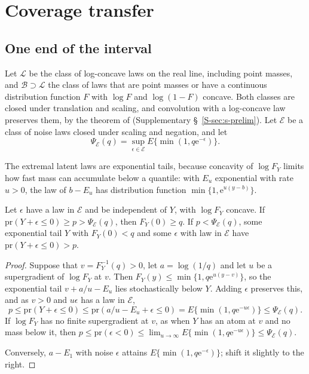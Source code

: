 \documentclass[lineno]{biometrika}
\newcommand{\pr}{\mathrm{pr}}
\newcommand{\LC}{\mathcal{L}}
\begin{document}
\section{Coverage transfer}\label{sec:general}

\subsection{One end of the interval}

Let $\LC$ be the class of log-concave laws on the real line, including point masses, and $\mathcal B \supset \LC$ the class of laws that are point masses or have a continuous distribution function $F$ with $\log F$ and $\log(1 - F)$ concave. Both classes are closed under translation and scaling, and convolution with a log-concave law preserves them, by the theorem of \citet{prekopa1973} (Supplementary \S~\ref{S-sec:s-prelim}). Let $\mathcal E$ be a class of noise laws closed under scaling and negation, and let
\[
\Psi_{\mathcal E}(q) = \sup_{\epsilon \in \mathcal E} E\{\min(1, q \mathrm{e}^{-\epsilon})\}.
\]

The extremal latent laws are exponential tails, because concavity of $\log F_Y$ limits how fast mass can accumulate below a quantile: with $E_u$ exponential with rate $u > 0$, the law of $b - E_u$ has distribution function $\min\{1, \mathrm{e}^{u(y - b)}\}$.

\begin{proposition}\label{prop:general}
Let $\epsilon$ have a law in $\mathcal E$ and be independent of $Y$, with $\log F_Y$ concave. If $\pr(Y + \epsilon \le 0) \ge p > \Psi_{\mathcal E}(q)$, then $F_Y(0) \ge q$. If $p < \Psi_{\mathcal E}(q)$, some exponential tail $Y$ with $F_Y(0) < q$ and some $\epsilon$ with law in $\mathcal E$ have $\pr(Y + \epsilon \le 0) > p$.
\end{proposition}

\begin{proof}
Suppose that $v = F_Y^{-1}(q) > 0$, let $a = \log(1/q)$ and let $u$ be a supergradient of $\log F_Y$ at $v$. Then $F_Y(y) \le \min\{1, q\mathrm{e}^{u(y - v)}\}$, so the exponential tail $v + a/u - E_u$ lies stochastically below $Y$. Adding $\epsilon$ preserves this, and as $v > 0$ and $u\epsilon$ has a law in $\mathcal E$,
\[
p \le \pr(Y + \epsilon \le 0) \le \pr(a/u - E_u + \epsilon \le 0) = E\{\min(1, q \mathrm{e}^{-u\epsilon})\} \le \Psi_{\mathcal E}(q).
\] If $\log F_Y$ has no finite supergradient at $v$, as when $Y$ has an atom at $v$ and no mass below it, then $p \le \pr(\epsilon < 0) \le \lim_{u\to\infty} E\{\min(1, q \mathrm{e}^{-u\epsilon})\} \le \Psi_{\mathcal E}(q)$.

Conversely, $a - E_1$ with noise $\epsilon$ attains $E\{\min(1, q \mathrm{e}^{-\epsilon})\}$; shift it slightly to the right.
\end{proof}
\end{document}
